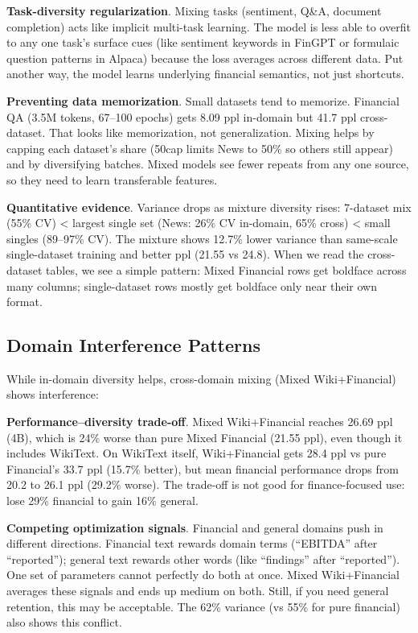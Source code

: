 \textbf{Task-diversity regularization}. Mixing tasks (sentiment, Q\&A, document completion) acts like implicit multi-task learning. The model is less able to overfit to any one task's surface cues (like sentiment keywords in FinGPT or formulaic question patterns in Alpaca) because the loss averages across different data. Put another way, the model learns underlying financial semantics, not just shortcuts.

\textbf{Preventing data memorization}. Small datasets tend to memorize. Financial QA (3.5M tokens, 67--100 epochs) gets 8.09 ppl in-domain but 41.7 ppl cross-dataset. That looks like memorization, not generalization. Mixing helps by capping each dataset's share (50cap limits News to 50\% so others still appear) and by diversifying batches. Mixed models see fewer repeats from any one source, so they need to learn transferable features.

\textbf{Quantitative evidence}. Variance drops as mixture diversity rises: 7-dataset mix (55\% CV) < largest single set (News: 26\% CV in-domain, 65\% cross) < small singles (89--97\% CV). The mixture shows 12.7\% lower variance than same-scale single-dataset training and better ppl (21.55 vs 24.8). When we read the cross-dataset tables, we see a simple pattern: Mixed Financial rows get boldface across many columns; single-dataset rows mostly get boldface only near their own format.

\subsection{Domain Interference Patterns}

While in-domain diversity helps, cross-domain mixing (Mixed Wiki+Financial) shows interference:

\textbf{Performance--diversity trade-off}. Mixed Wiki+Financial reaches 26.69 ppl (4B), which is 24\% worse than pure Mixed Financial (21.55 ppl), even though it includes WikiText. On WikiText itself, Wiki+Financial gets 28.4 ppl vs pure Financial's 33.7 ppl (15.7\% better), but mean financial performance drops from 20.2 to 26.1 ppl (29.2\% worse). The trade-off is not good for finance-focused use: lose 29\% financial to gain 16\% general.

\textbf{Competing optimization signals}. Financial and general domains push in different directions. Financial text rewards domain terms (``EBITDA'' after ``reported''); general text rewards other words (like ``findings'' after ``reported''). One set of parameters cannot perfectly do both at once. Mixed Wiki+Financial averages these signals and ends up medium on both. Still, if you need general retention, this may be acceptable. The 62\% variance (vs 55\% for pure financial) also shows this conflict.

